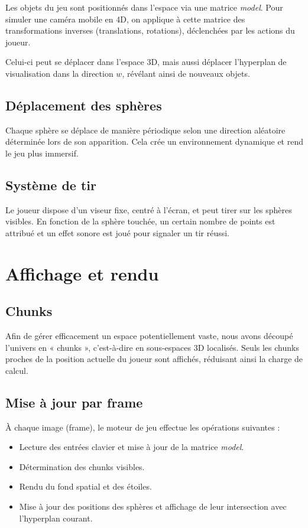\documentclass[11pt,a4paper]{article}
\begin{document}
Les objets du jeu sont positionnés dans l’espace via une matrice \textit{model}. Pour simuler une caméra mobile en 4D, on applique à cette matrice des transformations inverses (translations, rotations), déclenchées par les actions du joueur.

Celui-ci peut se déplacer dans l’espace 3D, mais aussi déplacer l’hyperplan de visualisation dans la direction $w$, révélant ainsi de nouveaux objets.

\subsection{Déplacement des sphères}

Chaque sphère se déplace de manière périodique selon une direction aléatoire déterminée lors de son apparition. Cela crée un environnement dynamique et rend le jeu plus immersif.

\subsection{Système de tir}

Le joueur dispose d’un viseur fixe, centré à l’écran, et peut tirer sur les sphères visibles. En fonction de la sphère touchée, un certain nombre de points est attribué et un effet sonore est joué pour signaler un tir réussi.

\section{Affichage et rendu}

\subsection{Chunks}

Afin de gérer efficacement un espace potentiellement vaste, nous avons découpé l’univers en « chunks », c’est-à-dire en sous-espaces 3D localisés. Seuls les chunks proches de la position actuelle du joueur sont affichés, réduisant ainsi la charge de calcul.

\subsection{Mise à jour par frame}

À chaque image (frame), le moteur de jeu effectue les opérations suivantes :
\begin{itemize}
	\item Lecture des entrées clavier et mise à jour de la matrice \textit{model}.
	\item Détermination des chunks visibles.
	\item Rendu du fond spatial et des étoiles.
	\item Mise à jour des positions des sphères et affichage de leur intersection avec l’hyperplan courant.
\end{itemize}
\end{document}

